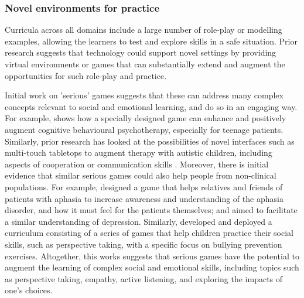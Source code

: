 \documentclass[prodmode,acmtochi]{acmsmall}
\begin{document}
\subsubsection{Novel environments for practice}

Curricula across all domains include a large number of role-play or modelling examples, allowing the learners to test and explore skills in a safe situation. Prior research suggests that technology could support novel settings by providing virtual environments or games that can substantially extend and augment the opportunities for such role-play and practice.  


Initial work on 'serious' games suggests that these can address many complex concepts relevant to social and emotional learning, and do so in an engaging way. For example,  shows how a specially designed game can enhance and positively augment cognitive behavioural psychotherapy, especially for teenage patients. Similarly, prior research has looked at the possibilities of novel interfaces such as multi-touch tabletops to augment therapy with autistic children, including aspects of cooperation \cite{Piper2006} or communication skills \cite{Zarin2011}. Moreover, there is initial evidence that similar serious games could also help people from non-clinical populations. For example,  designed a game that helps relatives and friends of patients with aphasia to increase awareness and understanding of the aphasia disorder, and how it must feel for the patients themselves; and  aimed to facilitate a similar understanding of depression. Similarly,  developed and deployed a curriculum consisting of a series of games that help children practice their social skills, such as perspective taking, with a specific focus on bullying prevention exercises.  %
Altogether, this works suggests that serious games have the potential to augment the learning of complex social and emotional skills, including topics such as perspective taking, empathy, active listening, and exploring the impacts of one's choices.
\end{document}
